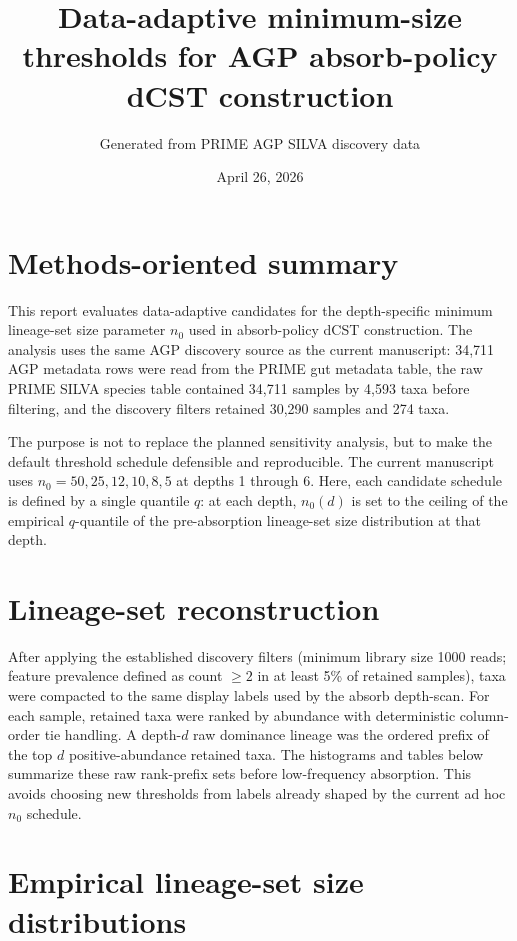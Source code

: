 \documentclass[11pt]{article}
\title{Data-adaptive minimum-size thresholds for AGP absorb-policy dCST construction}
\author{Generated from PRIME AGP SILVA discovery data}
\date{April 26, 2026}
\begin{document}
\maketitle

\section*{Methods-oriented summary}
This report evaluates data-adaptive candidates for the depth-specific minimum lineage-set size parameter $n_0$ used in absorb-policy dCST construction. The analysis uses the same AGP discovery source as the current manuscript: 34,711 AGP metadata rows were read from the PRIME gut metadata table, the raw PRIME SILVA species table contained 34,711 samples by 4,593 taxa before filtering, and the discovery filters retained 30,290 samples and 274 taxa.

The purpose is not to replace the planned sensitivity analysis, but to make the default threshold schedule defensible and reproducible. The current manuscript uses $n_0 = 50, 25, 12, 10, 8, 5$ at depths 1 through 6. Here, each candidate schedule is defined by a single quantile $q$: at each depth, $n_0(d)$ is set to the ceiling of the empirical $q$-quantile of the pre-absorption lineage-set size distribution at that depth.

\section*{Lineage-set reconstruction}
After applying the established discovery filters (minimum library size 1000 reads; feature prevalence defined as count $\geq 2$ in at least 5\% of retained samples), taxa were compacted to the same display labels used by the absorb depth-scan. For each sample, retained taxa were ranked by abundance with deterministic column-order tie handling. A depth-$d$ raw dominance lineage was the ordered prefix of the top $d$ positive-abundance retained taxa. The histograms and tables below summarize these raw rank-prefix sets before low-frequency absorption. This avoids choosing new thresholds from labels already shaped by the current ad hoc $n_0$ schedule.

\section*{Empirical lineage-set size distributions}
\begin{table}[H]
\centering
\scriptsize
\caption{Pre-absorption AGP SILVA dominance-lineage set size distributions by depth. Current ECDF is the empirical percentile position of the current manuscript threshold, computed as the fraction of raw lineage sets with size less than or equal to the current $n_0$.}
\resizebox{\linewidth}{!}{}
\end{table}
\end{document}
